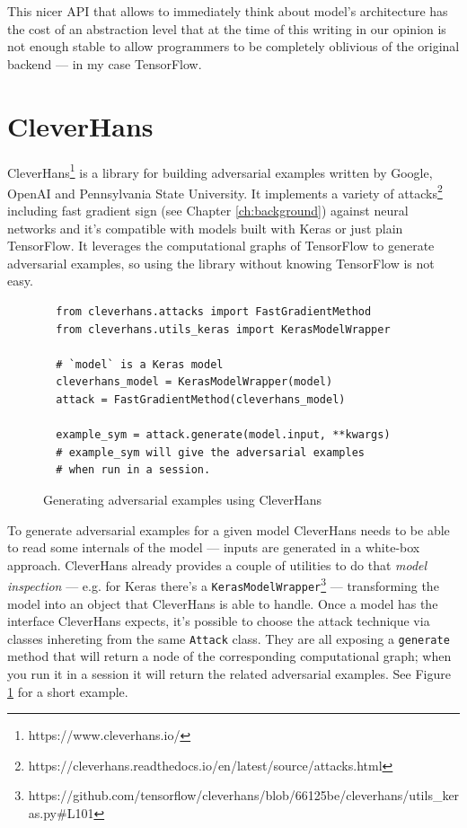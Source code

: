 This nicer API that allows to immediately think about model's
architecture has the cost of an abstraction level that at the time of
this writing in our opinion is not enough stable to allow programmers
to be completely oblivious of the original backend --- in my case
TensorFlow.

\section{CleverHans}
\label{sec:cleverhans}

CleverHans\footnote{https://www.cleverhans.io/} is a library for
building adversarial examples written by Google, OpenAI and
Pennsylvania State University. It implements a variety of
attacks\footnote{https://cleverhans.readthedocs.io/en/latest/source/attacks.html}
including fast gradient sign (see Chapter \ref{ch:background})
against neural networks and it's compatible with models built with
Keras or just plain TensorFlow. It leverages the computational graphs
of TensorFlow to generate adversarial examples, so using the
library without knowing TensorFlow is not easy.

\begin{figure}
  \begin{verbatim}
  from cleverhans.attacks import FastGradientMethod
  from cleverhans.utils_keras import KerasModelWrapper

  # `model` is a Keras model
  cleverhans_model = KerasModelWrapper(model)
  attack = FastGradientMethod(cleverhans_model)

  example_sym = attack.generate(model.input, **kwargs)
  # example_sym will give the adversarial examples
  # when run in a session.
  \end{verbatim}
  \caption{Generating adversarial examples using CleverHans}
  \label{fig:cleverhans-attack-dot-generate}
\end{figure}

To generate adversarial examples for a given model CleverHans needs to
be able to read some internals of the model --- inputs are generated in
a white-box approach. CleverHans already provides a couple of utilities
to do that \emph{model inspection} --- e.g. for Keras there's a
\texttt{KerasModelWrapper}\footnote{https://github.com/tensorflow/cleverhans/blob/66125be/cleverhans/utils\_keras.py\#L101}
--- transforming the model into an object that CleverHans is able to
handle. Once a model has the interface CleverHans expects, it's
possible to choose the attack technique via classes inhereting from the
same \texttt{Attack} class. They are all exposing a \texttt{generate}
method that will return a node of the corresponding computational
graph; when you run it in a session it will return the related
adversarial examples. See Figure
\ref{fig:cleverhans-attack-dot-generate} for a short example.

